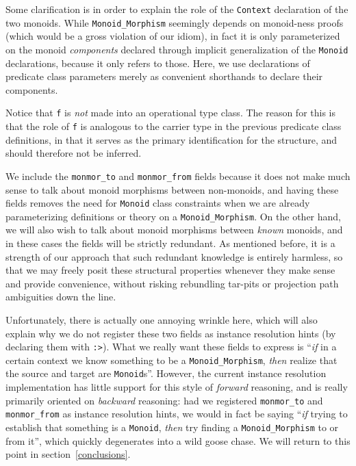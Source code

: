 \documentclass[a4paper,10pt,runningheads]{llncs}
\begin{document}
Some clarification is in order to explain the role of the \lstinline|Context| declaration of the two monoids. While \lstinline|Monoid_Morphism| seemingly depends on monoid-ness proofs (which would be a gross violation of our idiom), in fact it is only parameterized on the monoid \emph{components} declared through implicit generalization of the \lstinline|Monoid| declarations, because it only refers to those. Here, we use declarations of predicate class parameters merely as convenient shorthands to declare their components.

Notice that \lstinline|f| is \emph{not} made into an operational type class. The reason for this is that the role of \lstinline|f| is analogous to the carrier type in the previous predicate class definitions, in that it serves as the primary identification for the structure, and should therefore not be inferred.

We include the \lstinline|monmor_to| and \lstinline|monmor_from| fields because it does not make much sense to talk about monoid morphisms between non-monoids, and having these fields removes the need for \lstinline|Monoid| class constraints when we are already parameterizing definitions or theory on a \lstinline|Monoid_Morphism|. On the other hand, we will also wish to talk about monoid morphisms between \emph{known} monoids, and in these cases the fields will be strictly redundant. As mentioned before, it is a strength of our approach that such redundant knowledge is entirely harmless, so that we may freely posit these structural properties whenever they make sense and provide convenience, without risking rebundling tar-pits or projection path ambiguities down the line.

Unfortunately, there is actually one annoying wrinkle here, which will also explain why we do not register these two fields as instance resolution hints (by declaring them with \lstinline|:>|). What we really want these fields to express is ``\emph{if} in a certain context we know something to be a \lstinline|Monoid_Morphism|, \emph{then} realize that the source and target are \lstinline|Monoid|s''. However, the current instance resolution implementation has little support for this style of \emph{forward} reasoning, and is really primarily oriented on \emph{backward} reasoning: had we registered \lstinline|monmor_to| and \lstinline|monmor_from| as instance resolution hints, we would in fact be saying ``\emph{if} trying to establish that something is a \lstinline|Monoid|, \emph{then} try finding a \lstinline|Monoid_Morphism| to or from it'', which quickly degenerates into a wild goose chase. We will return to this point in section~\ref{conclusions}.
\end{document}
